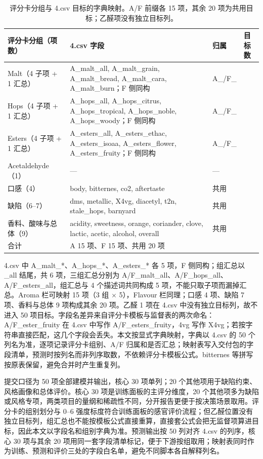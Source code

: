 \begin{table}[t]
\centering\small\renewcommand{\arraystretch}{1.15}
\caption{评分卡分组与 4.csv 目标的字典映射。A/F 前缀各 15 项，其余 20 项为共用目标；乙醛项没有独立目标列。}
\label{tab:dims}
\begin{tabular}{@{}>{\raggedright\arraybackslash}p{}>{\raggedright\arraybackslash}p{}>{\raggedright\arraybackslash}p{}>{\raggedright\arraybackslash}p{}@{}}
\toprule
评分卡分组（项数） & 4.csv 字段 & 归属 & 目标数 \\
\midrule
Malt（4 子项 + 1 汇总） & A\_malt\_all, A\_malt\_grain, A\_malt\_bread, A\_malt\_cara, A\_malt\_burn；F 侧同构 & A\_/F\_ & 10 \\
Hops（4 子项 + 1 汇总） & A\_hops\_all, A\_hops\_citrus, A\_hops\_tropical, A\_hops\_noble, A\_hops\_woody；F 侧同构 & A\_/F\_ & 10 \\
Esters（4 子项 + 1 汇总） & A\_esters\_all, A\_esters\_ethac, A\_esters\_isoaa, A\_esters\_flower, A\_esters\_fruity；F 侧同构 & A\_/F\_ & 10 \\
Acetaldehyde（1） & — & — & 0 \\
口感（4） & body, bitternes, co2, aftertaste & 共用 & 4 \\
缺陷（6--7） & dms, metallic, X4vg, diacetyl, t2n, stale\_hops, barnyard & 共用 & 7 \\
香料、酸味与总体（9） & acidity, sweetness, orange, coriander, clove, lactic, acetic, alcohol, overall & 共用 & 9 \\
\midrule
合计 & A 15 项、F 15 项、共用 20 项 & & 50 \\
\bottomrule
\end{tabular}
\end{table}

4.csv 中 A\_malt\_*、A\_hops\_*、A\_esters\_* 各 5 项，F 侧同构；组汇总以 \_all 结尾，共 6 项，三组汇总分别为 A/F\_malt\_all、A/F\_hops\_all、A/F\_esters\_all，组汇总与 4 个描述词共同构成 5 项，不能只取子项而漏掉汇总。Aroma 栏可映射 15 项（3 组 $\times$ 5），Flavour 栏同理；口感 4 项、缺陷 7 项、香料与总体 9 项构成其余 20 项。乙醛 1 项在 4.csv 中没有独立目标列，故不进入 50 项目标。字段名差异来自评分卡模板与监督表的两次命名：A/F\_ester\_fruity 在 4.csv 中写作 A/F\_esters\_fruity，4vg 写作 X4vg；若按字符串直接匹配，这几个字段会丢失。本文按显式字典映射，字典以 4.csv 的 50 个列名为准，逐项记录评分卡组别、A/F 归属和是否汇总；映射表写入交付包的字段清单，预测时按列名而非列序取数，不依赖评分卡模板公式。bitternes 等拼写按原表保留，避免合并时产生重复列。

提交口径为 50 项全部建模并输出，核心 30 项单列；20 个其他项用于缺陷约束、风格画像和总体评价。核心 30 项是训练面板的主评分维度，20 个其他项多为缺陷或风格专项，两类项目的量纲和稀疏性不同，分开报告更便于按决策场景取用。评分卡的组别划分与 0--6 强度标度符合训练面板的感官评价流程\cite{schreurs2024}；但乙醛位置没有独立目标列，组汇总也不能按模板公式直接重算，直接套公式会把无监督项算进目标，因此本文以字段名和组别字典为准。预测输出按 50 列对齐 4.csv 的列序，核心 30 项与其余 20 项用同一套字段清单标记，便于下游按组取用；映射表同时作为训练、预测和评价三处的字段白名单，避免不同脚本各自解释列名。
